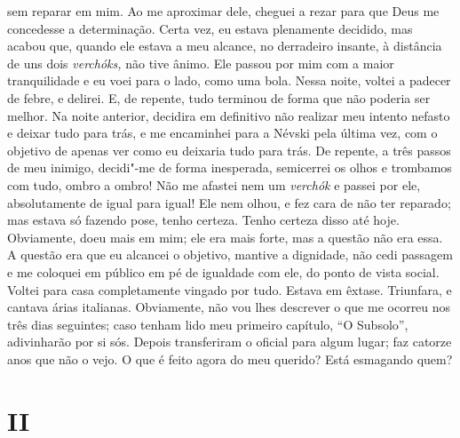 sem reparar em mim. Ao me aproximar dele, cheguei a rezar para que Deus
me concedesse a determinação. Certa vez, eu estava plenamente decidido,
mas acabou que, quando ele estava a meu alcance, no derradeiro insante,
à distância de uns dois \emph{verchóks,} não tive ânimo. Ele passou por
mim com a maior tranquilidade e eu voei para o lado, como uma bola.
Nessa noite, voltei a padecer de febre, e delirei. E, de repente, tudo
terminou de forma que não poderia ser melhor. Na noite anterior,
decidira em definitivo não realizar meu intento nefasto e deixar tudo
para trás, e me encaminhei para a Névski pela última vez, com o objetivo
de apenas ver como eu deixaria tudo para trás. De repente, a três passos
de meu inimigo, decidi"-me de forma inesperada, semicerrei os olhos e
trombamos com tudo, ombro a ombro! Não me afastei nem um \emph{verchók}
e passei por ele, absolutamente de igual para igual! Ele nem olhou, e
fez cara de não ter reparado; mas estava só fazendo pose, tenho certeza.
Tenho certeza disso até hoje. Obviamente, doeu mais em mim; ele era mais
forte, mas a questão não era essa. A questão era que eu alcancei o
objetivo, mantive a dignidade, não cedi passagem e me coloquei em
público em pé de igualdade com ele, do ponto de vista social. Voltei
para casa completamente vingado por tudo. Estava em êxtase. Triunfara, e
cantava árias italianas. Obviamente, não vou lhes descrever o que me
ocorreu nos três dias seguintes; caso tenham lido meu primeiro capítulo,
``O Subsolo'', adivinharão por si sós. Depois transferiram o oficial
para algum lugar; faz catorze anos que não o vejo. O que é feito agora
do meu querido? Está esmagando quem?

\section{II}


